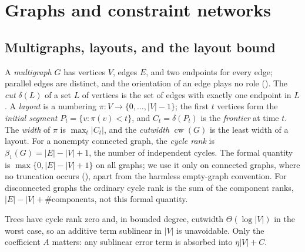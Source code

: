 \documentclass[11pt]{article}
\newcommand{\leanrefs}[1]{{\unskip\nobreak\hfil\penalty50\hskip1em\null\nobreak\hfil
  {\normalfont\small #1}\parfillskip=0pt\finalhyphendemerits=0\par}}
\newcommand{\leanref}[1]{\leanrefs{\lean{#1}}}
\theoremstyle{plain}
\theoremstyle{definition}
\theoremstyle{remark}
\newcommand{\N}{\mathbb{N}}
\newcommand{\cut}{\delta}
\newcommand{\LB}{\mathrm{LB}}
\newcommand{\card}[1]{\lvert #1\rvert}
\DeclareMathOperator{\cw}{cw}
\begin{document}
\section{Graphs and constraint networks}
\label{sec:networks}

\subsection{Multigraphs, layouts, and the layout bound}

A \emph{multigraph} $G$ has vertices $V$, edges $E$, and two endpoints for every edge; parallel
edges are distinct, and the orientation of an edge plays no role
(). The \emph{cut} $\cut(L)$ of a set $L$ of vertices is the set of
edges with exactly one endpoint in $L$. A \emph{layout} is a numbering
$\pi \colon V \to \{0, \dots, \card V - 1\}$; the first $t$ vertices form the
\emph{initial segment} $P_t = \{v : \pi(v) < t\}$, and $C_t = \cut(P_t)$ is the
\emph{frontier} at time $t$. The \emph{width} of $\pi$ is $\max_t \card{C_t}$, and the
\emph{cutwidth} $\cw(G)$ is the least width of a layout. For a nonempty connected graph, the
\emph{cycle rank} is $\beta_1(G) = \card E - \card V + 1$, the number of independent cycles.
The formal quantity  is
$\max\{0,\card E-\card V+1\}$ on all graphs; we use it only on connected graphs, where no
truncation occurs (), apart from the harmless
empty-graph convention. For disconnected graphs the ordinary cycle rank is the sum of the
component ranks, $\card E-\card V+\#\mathrm{components}$, not this formal quantity.


Trees have cycle rank zero and, in bounded degree, cutwidth $\Theta(\log \card V)$ in the worst
case, so an additive term sublinear in $\card V$ is unavoidable. Only the coefficient $A$
matters: any sublinear error term is absorbed into $\eta\card V + C$.
\end{document}
